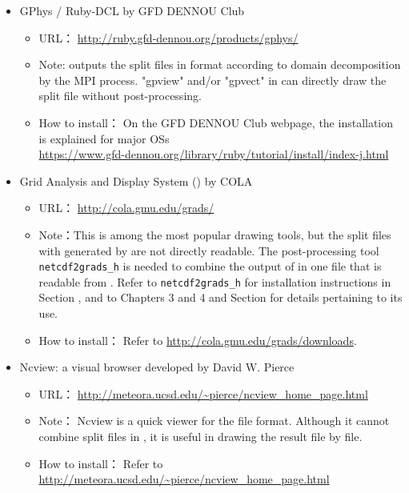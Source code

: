 \begin{itemize}
\item GPhys / Ruby-DCL by GFD DENNOU Club
 \begin{itemize}
  \item URL： \url{http://ruby.gfd-dennou.org/products/gphys/}
  \item Note: \scalelib outputs the split files
  in {\netcdf} format according to domain decomposition by the MPI process.
  "gpview" and/or "gpvect" in {\gphys} can directly draw the split file without post-processing.
  \item How to install：
  On the GFD DENNOU Club webpage, the installation is explained for major OSs\\
  \url{https://www.gfd-dennou.org/library/ruby/tutorial/install/index-j.html}\\
   \end{itemize}
\item Grid Analysis and Display System (\grads) by COLA
 \begin{itemize}
  \item URL： \url{http://cola.gmu.edu/grads/}
  \item Note：This is among the most popular drawing tools,
  but the split files with {\netcdf} generated by \scalelib are not directly readable.
  The post-processing tool \verb|netcdf2grads_h| is needed to combine the output of \scalelib in one file that is readable from \grads. Refer to \verb|netcdf2grads_h| for installation instructions in Section \label{sec:source_net2g}, and to Chapters 3 and 4 and Section \label{sec:net2g} for details pertaining to its use.
  \item How to install： Refer to \url{http://cola.gmu.edu/grads/downloads}.
 \end{itemize}
\item Ncview: a {\netcdf} visual browser developed by David W. Pierce
 \begin{itemize}
  \item URL： \url{http://meteora.ucsd.edu/~pierce/ncview_home_page.html}
  \item Note： Ncview is a quick viewer for the {\netcdf} file format.
  Although it cannot combine split files in \scalelib, it is useful in drawing the result file by file.
  \item How to install： Refer to \url{http://meteora.ucsd.edu/~pierce/ncview_home_page.html}
 \end{itemize}
\end{itemize}


